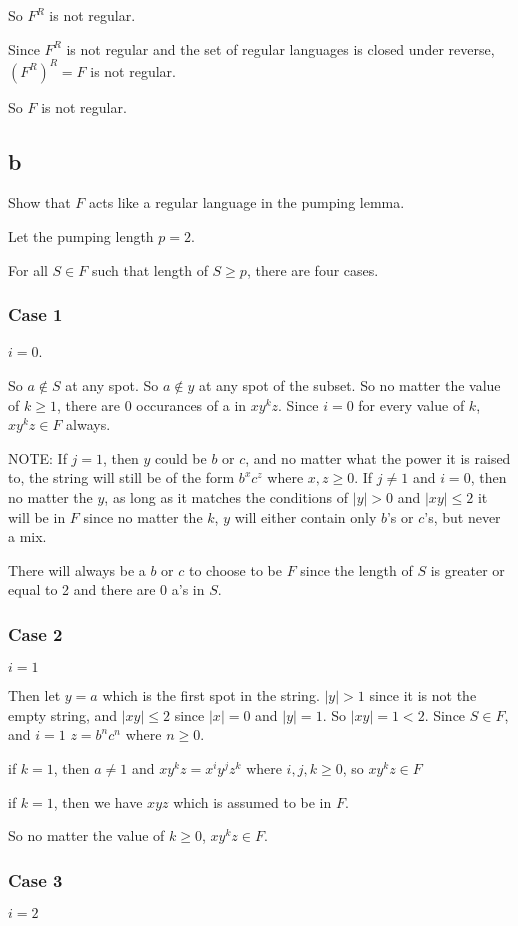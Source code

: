 \documentclass[letterpaper, 11pt]{article}
\begin{document}
So $F^R$ is not regular.

Since $F^R$ is not regular and the set of regular languages is closed under reverse, $(F^R)^R = F$ is not regular.

So $F$ is not regular.
\subsection*{b}
Show that $F$ acts like a regular language in the pumping lemma.

Let the pumping length $p = 2$.

For all $S \in F$ such that length of $S \geq p$, there are four cases.
\subsubsection*{Case 1}
$i = 0$.

So $a \notin S$ at any spot.
So $a \notin y$ at any spot of the subset.
So no matter the value of $k \geq 1$, there are $0$ occurances of a in $xy^kz$.
Since $i = 0$ for every value of $k$, $xy^kz \in F$ always.

NOTE: If $j = 1$, then $y$ could be $b$ or $c$, and no matter what the power it is raised to, the string will still be of the form $b^xc^z$ where $x,z \geq 0$.
If $j \neq 1$ and $i = 0$, then no matter the $y$, as long as it matches the conditions of $|y| > 0$ and $|xy| \leq 2$ it will be in $F$ since no matter the $k$, $y$ will either contain only $b$'s or $c$'s, but never a mix. 

There will always be a $b$ or $c$ to choose to be $F$ since the length of $S$ is greater or equal to 2 and there are 0 a's in $S$.
\subsubsection*{Case 2}
$i = 1$

Then let $y = a$ which is the first spot in the string.
$|y| > 1$ since it is not the empty string, and $|xy| \leq 2$ since $|x| = 0$ and $|y| = 1$.
So $|xy| = 1 < 2$.
Since $S \in F$, and $i = 1$ $z = b^nc^n$ where $n \geq 0$.

if $k = 1$, then $a \neq 1$ and $xy^kz = x^iy^jz^k$ where $i,j,k \geq 0$, so $xy^kz \in F$

if $k = 1$, then we have $xyz$ which is assumed to be in $F$.

So no matter the value of $k \geq 0$, $xy^kz \in F$.
\subsubsection*{Case 3}
$i = 2$
\end{document}
